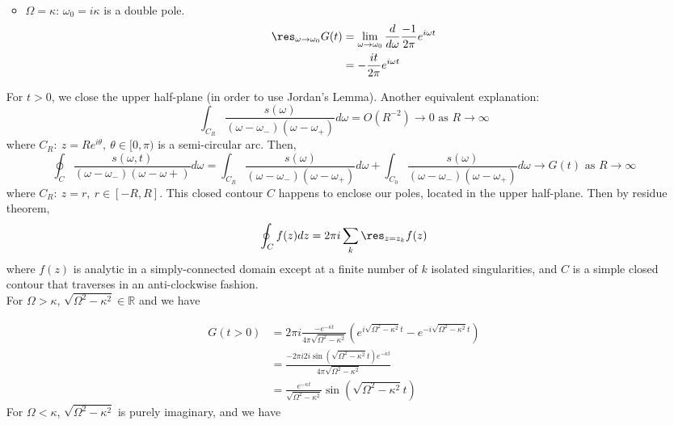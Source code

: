\documentclass[a4paper]{article}
\begin{document}
\begin{ans}
\begin{enumerate}[label=(\alph*)]
\begin{itemize}
\begin{align}
    \end{align}
    \item $\Omega=\kappa$: $\omega_0=i\kappa$ is a double pole.
    \begin{align}
        \res_{\omega\rightarrow\omega_0}G(t)&=\lim_{\omega\rightarrow\omega_0}\frac{d}{d\omega}\frac{-1}{2\pi}e^{i\omega t}\nonumber\\&=-\frac{it}{2\pi}e^{i\omega t}\nonumber
    \end{align}
\end{itemize}
For $t>0$, we close the upper half-plane (in order to use Jordan's Lemma). Another equivalent explanation:
$$\int_{C_R}\frac{s(\omega)}{(\omega-\omega_-)(\omega-\omega_+)}d\omega=O(R^{-2})\rightarrow0\text{ as }R\rightarrow\infty$$
where $C_R:~z=Re^{i\theta},~\theta\in[0,\pi)$ is a semi-circular arc. Then,
$$\oint_C\frac{s(\omega,t)}{(\omega-\omega_-)(\omega-\omega+)}d\omega=\int_{C_R}\frac{s(\omega)}{(\omega-\omega_-)(\omega-\omega_+)}d\omega+\int_{C_0}\frac{s(\omega)}{(\omega-\omega_-)(\omega-\omega_+)}d\omega\rightarrow G(t)\text{ as } R\rightarrow \infty$$
where $C_R:~z=r,~r\in[-R,R]$. This closed contour $C$ happens to enclose our poles, located in the upper half-plane. Then by residue theorem,
$$\oint_Cf(z)dz=2\pi i\sum_k\res_{z=z_k}f(z)$$
where $f(z)$ is analytic in a simply-connected domain except at a finite number of $k$ isolated singularities, and $C$ is a simple closed contour that traverses in an anti-clockwise fashion.\\[5pt]
For $\Omega>\kappa$, $\sqrt{\Omega^2-\kappa^2}\in\mathbb{R}$ and we have
\begin{center}
  \end{center}
\begin{align}
G(t>0)&=2\pi i\frac{-e^{-\kappa t}}{4\pi\sqrt{\Omega^2-\kappa^2}}(e^{i\sqrt{\Omega^2-\kappa^2}t}-e^{-i\sqrt{\Omega^2-\kappa^2}t})\nonumber\\&=\frac{-2\pi i2i\sin(\sqrt{\Omega^2-\kappa^2}t)e^{-\kappa t}}{4\pi\sqrt{\Omega^2-\kappa^2}}\nonumber\\&=\frac{e^{-\kappa t}}{\sqrt{\Omega^2-\kappa^2}}\sin(\sqrt{\Omega^2-\kappa^2}t)\nonumber
\end{align}
For $\Omega<\kappa$, $\sqrt{\Omega^2-\kappa^2}$ is purely imaginary, and we have
\begin{center}
\end{center}
\end{enumerate}
\end{ans}
\end{document}
